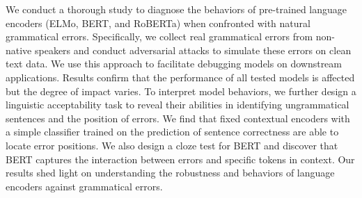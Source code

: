 We conduct a thorough study to diagnose the behaviors of pre-trained language encoders (ELMo, BERT, and RoBERTa) when confronted with natural grammatical errors. Specifically, we collect real grammatical errors from non-native speakers and conduct adversarial attacks to simulate these errors on clean text data. We use this approach to facilitate debugging models on downstream applications. Results confirm that the performance of all tested models is affected but the degree of impact varies. To interpret model behaviors, we further design a linguistic acceptability task to reveal their abilities in identifying ungrammatical sentences and the position of errors. We find that fixed contextual encoders with a simple classifier trained on the prediction of sentence correctness are able to locate error positions. We also design a cloze test for BERT and discover that BERT captures the interaction between errors and specific tokens in context. Our results shed light on understanding the robustness and behaviors of language encoders against grammatical errors.
